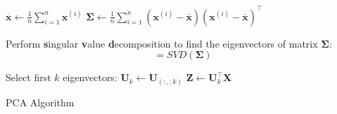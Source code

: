 \begin{frame}[plain]{}{}
	\begin{algorithm}[H]
		\DontPrintSemicolon
		\footnotesize
		$\overline{\bm{x}}
			\longleftarrow \frac{1}{n} \sum_{i=1}^n \bm{x}^{(i)}$
			\;
		$\bm{\Sigma}
			\longleftarrow \frac{1}{n} \sum_{i = 1}^n (\bm{x}^{(i)} - \overline{\bm{x}}) (\bm{x}^{(i)}
				- \overline{\bm{x}})^{\intercal}$
				\;

		Perform \textbf{s}ingular \textbf{v}alue \textbf{d}ecomposition to find the eigenvectors of matrix $\bm{\Sigma}$:
		\begin{equation*}
			[\bm{U}, \bm{S}, \bm{V}] = SVD(\bm{\Sigma})
		\end{equation*}
		\vspace*{-6mm}

		Select first $k$ eigenvectors: $\bm{U}_k \longleftarrow \bm{U}_{(:,:k)}$
			\;
		$\bm{Z} \longleftarrow \bm{U}_k^{\intercal} \bm{X}$ 
		\caption{PCA Algorithm}
	\end{algorithm}
\end{frame}


